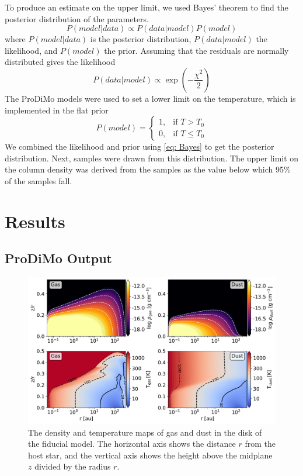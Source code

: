 \documentclass[twoside, single, authoryear, semicolon, 12pt]{lion-msc}
\newcommand{\4}{$_4$}
\newcommand{\3}{$_3$}
\newcommand{\2}{$_2$}
\begin{document}
To produce an estimate on the upper limit, we used Bayes' theorem to find the posterior distribution of the parameters. 
\begin{equation}
    P(model|data)\propto P(data|model)P(model)
    \label{eq: Bayes}
\end{equation}
where $P(model|data)$ is the posterior distribution, $P(data|model)$ the likelihood, and $P(model)$ the prior. Assuming that the residuals are normally distributed gives the likelihood
\begin{equation}
    P(data|model)\propto\exp\left(-\frac{\chi^2}{2}\right)
\end{equation}
The ProDiMo models were used to set a lower limit on the temperature, which is implemented in the flat prior
\begin{equation}
    P(model) = 
    \begin{cases}
        1, & \text{if } T > T_0 \\
        0, & \text{if } T \leq T_0
    \end{cases}
\end{equation}
We combined the likelihood and prior using \autoref{eq: Bayes} to get the posterior distribution. Next, samples were drawn from this distribution. The upper limit on the column density was derived from the samples as the value below which 95\% of the samples fall. 


\chapter{Results}\label{Ch: Results}
\section{ProDiMo Output}

\begin{figure}[H]
    \centering
    \includegraphics[width=\linewidth]{Figures/DensityTemperature.pdf}
    \caption{The density and temperature maps of gas and dust in the disk of the fiducial model. The horizontal axis shows the distance $r$ from the host star, and the vertical axis shows the height above the midplane $z$ divided by the radius $r$.}
    \label{fig: tempdensity}
\end{figure}
\end{document}
